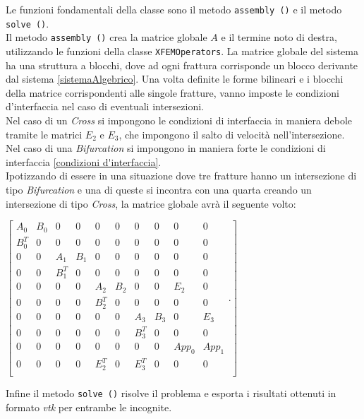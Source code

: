 Le funzioni fondamentali della classe sono il metodo \texttt{assembly ()} e il metodo \texttt{solve ()}. \\
\noindent Il metodo \texttt{assembly ()} crea la matrice globale $A$ e il termine noto di destra, utilizzando le funzioni della classe \texttt{XFEMOperators}. 
La matrice globale del sistema ha una struttura a blocchi, dove ad ogni frattura corrisponde un blocco derivante dal sistema \ref{sistemaAlgebrico}. Una volta definite le forme bilineari e i blocchi della matrice corrispondenti alle singole fratture, vanno imposte le condizioni d'interfaccia nel caso di eventuali intersezioni.\\
\noindent Nel caso di un \textit{Cross} si impongono le condizioni di interfaccia in maniera debole tramite le matrici $E_{2}$ e $E_{3}$, che impongono il salto di velocità nell'intersezione.\\
\noindent Nel caso di una \textit{Bifurcation} si impongono in maniera forte le condizioni di interfaccia \ref{condizioni d'interfaccia}.\\
Ipotizzando di essere in una situazione dove tre fratture hanno un intersezione di tipo \textit{Bifurcation} e una di queste si incontra con una quarta creando un intersezione di tipo \textit{Cross}, la matrice globale avrà il seguente volto:\\
 \begin{center}
  $ \left[ \begin{matrix}
 			A_{0} &  B_{0} & 0 & 0 & 0 & 0 & 0 & 0 & 0 & 0\\ 
 			B_{0}^{T} & 0 & 0 & 0 & 0 & 0 & 0 & 0 & 0 & 0\\
 			0 & 0 & A_{1} &  B_{1} & 0 & 0 & 0 & 0 & 0 & 0 \\ 
		 	0 & 0 & B_{1}^{T} & 0 & 0 & 0 & 0 & 0 & 0 & 0 \\
		 	0 & 0 & 0 & 0 & A_{2} &  B_{2} & 0 & 0 & E_{2} & 0\\ 
		 	0 & 0 & 0 & 0 & B_{2}^{T} & 0 & 0 & 0 & 0 & 0\\
		 	0 & 0 & 0 & 0 & 0 & 0 & A_{3} &  B_{3} & 0 & E_{3} \\ 
 			0 & 0 & 0 & 0 & 0 & 0 & B_{3}^{T} & 0 & 0 & 0\\
 			0 & 0 & 0 & 0 & 0 & 0 & 0 & 0 & App_{0} & App_{1} \\
 			0 & 0 & 0 & 0 & E_{2}^{T} & 0 & E_{3}^{T} & 0 & 0 & 0\\
 			\end{matrix}.\right] $ 
  \end{center}
Infine il metodo \texttt{solve ()} risolve il problema e esporta i risultati ottenuti in formato \emph{vtk} per entrambe le incognite.\\

